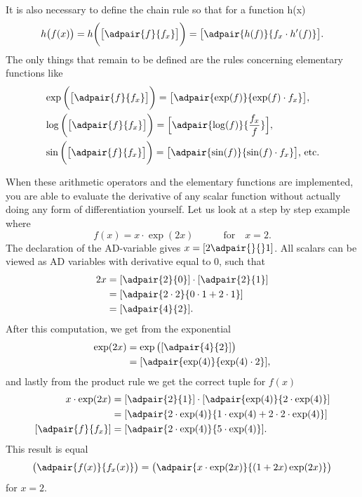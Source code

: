 It is also necessary to define the chain rule so that for a function h(x)
\begin{equation*}
h\big(f(x)\big) = h\bigg(\big[ \adpair{f }{f_x}  \big]\bigg) = \big[ \adpair{h(f)}{ f_x\cdot h'(f)} \big].
\end{equation*}
The only things that remain to be defined are the rules concerning elementary functions like
\begin{equation}
    \begin{aligned}
    &\exp\bigg(\big[ \adpair{f}{f_x}  \big]\bigg) =  \big[ \adpair{\exp(f)}{\exp(f)\cdot f_x}  \big],\\
    &\log\bigg(\big[ \adpair{f}{f_x}  \big]\bigg) =  \Big[  \adpair{\log(f)}{\frac{f_x}{f}}   \Big],\\
    &\sin\bigg(\big[  \adpair{f}{f_x}   \big]\bigg) =  \big[  \adpair{\sin(f)}{\sin(f)\cdot f_x}   \big]\text{,  etc.}\\
\end{aligned}
\label{eq:elementaryFunctions}
\end{equation}

When these arithmetic operators and the elementary functions are implemented, you are able to evaluate the derivative of any scalar function without actually doing any form of differentiation yourself. Let us look at a step by step example where 
\begin{equation}
    \label{eq:forwardADExample}
    f(x) = x\cdot\exp(2x) \hspace{3em} \text{for}\hspace{1em} x = 2.
\end{equation}
The declaration of the AD-variable gives $x = [2 \adpair{}{}  1]$. All scalars can be viewed as AD variables with derivative equal to 0, such that
\begin{align*}
    2x &= [ \adpair{2}{0}  ]\cdot [ \adpair{2}{1} ] \\
    &=[ \adpair{2\cdot2}{0\cdot1 + 2\cdot 1}  ]\\
    &=[ \adpair{4}{2} ].
\end{align*}
After this computation, we get from the exponential
\begin{align*}
    \exp(2x) &= \exp\big([ \adpair{4}{2} ]\big)\\
    &= [ \adpair{\exp(4)}{\exp(4)\cdot 2} ],
\end{align*}
and lastly from the product rule we get the correct tuple for $f(x)$
\begin{align*}
    x\cdot \exp(2x) &= [\adpair{2}{1}]\cdot [\adpair{\exp(4)}{2\cdot\exp(4)}]\\
    &=[\adpair{2\cdot\exp(4)}{1\cdot\exp(4) + 2\cdot 2\cdot\exp(4)}]\\
    [\adpair{f}{f_x}] & = [ \adpair{2\cdot\exp(4)}{5\cdot\exp(4)}].
\end{align*}
This result is equal
\begin{equation*}
    \big(\adpair{f(x)}{f_x(x)}\big) = \big(\adpair{x\cdot\exp(2x)}{(1+2x)\exp(2x)}\big)
\end{equation*}
for $x = 2$.


